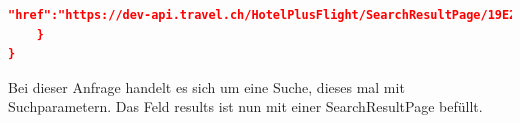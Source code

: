 \begin{lstlisting}[language=json,firstnumber=1]
        "href":"https://dev-api.travel.ch/HotelPlusFlight/SearchResultPage/19E2B6BB-1F06-4396-B86E-169EDB368B0E?hotelCategories%5B0%5D=https%3A%2F%2Fdev-api.travel.ch%2FHotelCategory%2FNone&hotelCategories%5B1%5D=https%3A%2F%2Fdev-api.travel.ch%2FHotelCategory%2FOne&hotelCategories%5B2%5D=https%3A%2F%2Fdev-api.travel.ch%2FHotelCategory%2FTwo&hotelCategories%5B3%5D=https%3A%2F%2Fdev-api.travel.ch%2FHotelCategory%2FThree&hotelCategories%5B4%5D=https%3A%2F%2Fdev-api.travel.ch%2FHotelCategory%2FFour&hotelCategories%5B5%5D=https%3A%2F%2Fdev-api.travel.ch%2FHotelCategory%2FFive&luggageOptions%5B0%5D=https%3A%2F%2Fdev-api.travel.ch%2FLuggageOption%2FWithLuggage&luggageOptions%5B1%5D=https%3A%2F%2Fdev-api.travel.ch%2FLuggageOption%2FWithoutLuggage&ratings.minimal=0&ratings.maximal=100&mealTypeCategories%5B0%5D=https%3A%2F%2Fdev-api.travel.ch%2FHotelMealTypeCategory%2FRoomOnly&mealTypeCategories%5B1%5D=https%3A%2F%2Fdev-api.travel.ch%2FHotelMealTypeCategory%2FBreakfast&mealTypeCategories%5B2%5D=https%3A%2F%2Fdev-api.travel.ch%2FHotelMealTypeCategory%2FHalfBoard&mealTypeCategories%5B3%5D=https%3A%2F%2Fdev-api.travel.ch%2FHotelMealTypeCategory%2FFullBoard&mealTypeCategories%5B4%5D=https%3A%2F%2Fdev-api.travel.ch%2FHotelMealTypeCategory%2FAllInclusive&sortMethod.Type=https%3A%2F%2Fdev-api.travel.ch%2FSortType%2FPrice"
    }
}
\end{lstlisting}
Bei dieser Anfrage handelt es sich um eine Suche, dieses mal mit Suchparametern. Das Feld results ist nun mit einer SearchResultPage befüllt.

